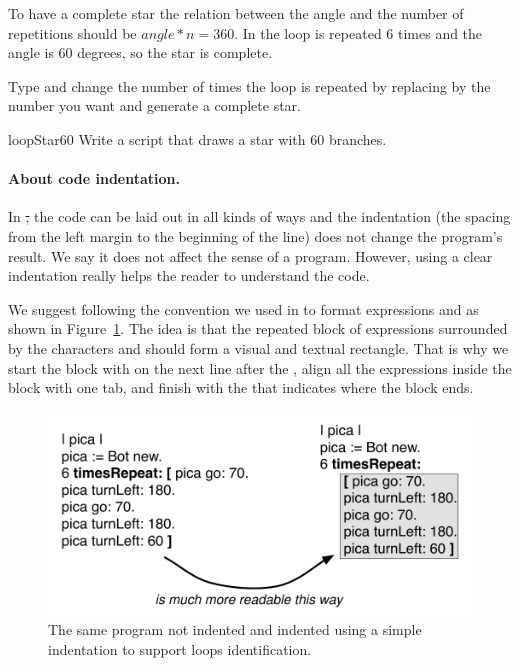 To have a complete star the relation between the angle and the number of repetitions should be $angle * n = 360$. In   the loop is repeated 6 times and the angle is 60 degrees, so the star is complete. 

Type  and change the number of times the loop is repeated by replacing  by the number you want and generate a complete star.  

\begin{exofig}{loopStar60}\label{scr:starsixty}
Write a script that draws a star with 60 branches.
\end{exofig}

\paragraph{About code indentation.}
In \st, the code can be laid out in all kinds of ways and the indentation (the spacing from the left margin  to the beginning of the line) does not change the program's result. We say it does not affect the sense of a program. However, using a clear indentation really helps the reader to understand the code. 

We suggest following the convention we used in  to format  expressions and as shown in Figure~\ref{fig:loopsindent}. The idea is that the repeated block of expressions surrounded by the characters \ct{[} and \ct{]} should form a visual and textual rectangle. That is why we start the block with \ct{[} on the next line after the , align all the expressions inside the block with one tab, and finish with the \ct{]} that indicates where the block ends. 

\begin{figure}[!h]
\centerline{\includegraphics[width=12cm]{indent}}
\caption{The same program not indented and indented using a simple indentation to support loops identification.} \label{fig:loopsindent}
\end{figure}

